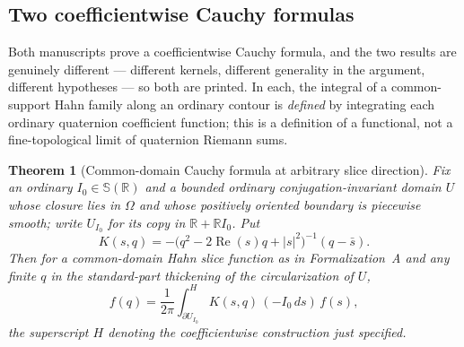 \documentclass[11pt,letterpaper]{article}
\numberwithin{equation}{section}
\newtheorem{theorem}{Theorem}[section]
\theoremstyle{definition}
\theoremstyle{remark}
\newcommand{\R}{\mathbb R}
\newcommand{\Rea}{\operatorname{Re}}
\newcommand{\abs}[1]{\left|#1\right|}
\begin{document}
\subsection{Two coefficientwise Cauchy formulas}\label{squat:sub:cauchy}
Both manuscripts prove a coefficientwise Cauchy formula, and the two results are genuinely
different --- different kernels, different generality in the argument, different hypotheses
--- so both are printed. In each, the integral of a common-support Hahn family along an
ordinary contour is \emph{defined} by integrating each ordinary quaternion coefficient
function; this is a definition of a functional, not a fine-topological limit of quaternion
Riemann sums.

\begin{theorem}[Common-domain Cauchy formula at arbitrary slice direction]
\label{squat:thm:cauchy-general}
Fix an \emph{ordinary} $I_0\in\mathbb S(\R)$ and a bounded ordinary
conjugation-invariant domain $U$ whose closure lies in $\Omega$ and whose positively
oriented boundary is piecewise smooth; write $U_{I_0}$ for its copy in $\R+\R I_0$. Put
\begin{equation}\label{squat:eq:cauchykernel}
 K(s,q)=-\bigl(q^2-2\Rea(s)q+\abs s^2\bigr)^{-1}(q-\bar s).
\end{equation}
Then for a common-domain Hahn slice function as in Formalization~A and any finite $q$ in
the standard-part thickening of the circularization of $U$,
\begin{equation}\label{squat:eq:cauchy}
 f(q)=\frac1{2\pi}\int_{\partial U_{I_0}}^{\!H}K(s,q)\,(-I_0\,ds)\,f(s),
\end{equation}
the superscript $H$ denoting the coefficientwise construction just specified.
\end{theorem}
\end{document}
